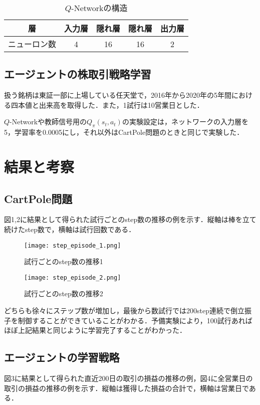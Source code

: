 \documentclass[twocolumn]{jarticle}
\begin{document}
        \begin{table}
            \caption{$Q$-Networkの構造}
            \begin{tabular}{|c|c|c|c|c|} \hline
                層 & 入力層 & 隠れ層 & 隠れ層 & 出力層 \\ \hline
                ニューロン数 & 4 & 16 & 16 & 2 \\ \hline
            \end{tabular}
        \end{table}
        
        \subsection{エージェントの株取引戦略学習}
        扱う銘柄は東証一部に上場している任天堂で，2016年から2020年の5年間における四本値と出来高を取得した．また，1試行は10営業日とした．
        
        $Q$-Networkや教師信号用の$Q_\pi(s_t,a_t)$の実験設定は，ネットワークの入力層を5，学習率を0.0005にし，それ以外はCartPole問題のときと同じで実験した．
    
\section{結果と考察}
        \subsection{CartPole問題}
        図1,2に結果として得られた試行ごとのstep数の推移の例を示す．縦軸は棒を立て続けたstep数で，横軸は試行回数である．

        \begin{figure}
            \texttt{[image: step\_episode\_1.png]}
            \caption{試行ごとのstep数の推移1}
        \end{figure}

        \begin{figure}
            \texttt{[image: step\_episode\_2.png]}
            \caption{試行ごとのstep数の推移2}
        \end{figure}

        どちらも徐々にステップ数が増加し，最後から数試行では200step連続で倒立振子を制御することができていることがわかる．予備実験により，100試行あればほぼ上記結果と同じように学習完了することがわかった．

        \subsection{エージェントの学習戦略}
        図3に結果として得られた直近200日の取引の損益の推移の例，図4に全営業日の取引の損益の推移の例を示す．縦軸は獲得した損益の合計で，横軸は営業日である．
\end{document}
